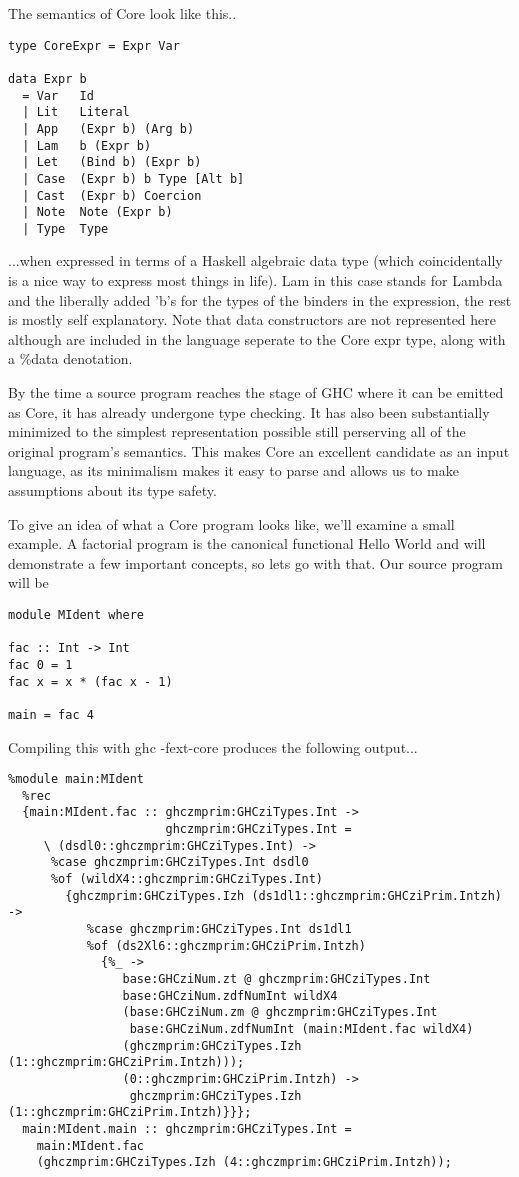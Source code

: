 \documentclass[11pt]{article}
\begin{document}
\noindent The semantics of Core look like this..

\begin{verbatim}
type CoreExpr = Expr Var

data Expr b 
  = Var	  Id
  | Lit   Literal
  | App   (Expr b) (Arg b)
  | Lam   b (Expr b)
  | Let   (Bind b) (Expr b)
  | Case  (Expr b) b Type [Alt b]
  | Cast  (Expr b) Coercion
  | Note  Note (Expr b)
  | Type  Type
\end{verbatim}

\noindent ...when expressed in terms of a Haskell algebraic data type (which 
coincidentally is a nice way to express most things in life). Lam in this
case stands for Lambda and the liberally added 'b's for the types of the binders
in the expression, the rest is mostly self explanatory. Note that data constructors
are not represented here although are included in the language seperate to the
Core expr type, along with a \%data denotation.

By the time a source program reaches the stage of GHC where it can be emitted
as Core, it has already undergone type checking. It has also been substantially 
minimized to the simplest representation
possible still perserving all of the original program's semantics. This makes
Core an excellent candidate as an input language, as its minimalism makes it
easy to parse and allows us to make assumptions about its type safety.

To give an idea of what a Core program looks like, we'll examine a small 
example. A factorial program is the canonical functional Hello World and will
demonstrate a few important concepts, so lets go with that. Our source program
will be 

\begin{verbatim}
module MIdent where

fac :: Int -> Int
fac 0 = 1
fac x = x * (fac x - 1)

main = fac 4
\end{verbatim}

\noindent Compiling this with ghc -fext-core produces the following output...

\begin{verbatim}
%module main:MIdent
  %rec
  {main:MIdent.fac :: ghczmprim:GHCziTypes.Int ->
                      ghczmprim:GHCziTypes.Int =
     \ (dsdl0::ghczmprim:GHCziTypes.Int) ->
      %case ghczmprim:GHCziTypes.Int dsdl0
      %of (wildX4::ghczmprim:GHCziTypes.Int)
        {ghczmprim:GHCziTypes.Izh (ds1dl1::ghczmprim:GHCziPrim.Intzh) ->
           %case ghczmprim:GHCziTypes.Int ds1dl1
           %of (ds2Xl6::ghczmprim:GHCziPrim.Intzh)
             {%_ ->
                base:GHCziNum.zt @ ghczmprim:GHCziTypes.Int 
                base:GHCziNum.zdfNumInt wildX4
                (base:GHCziNum.zm @ ghczmprim:GHCziTypes.Int
                 base:GHCziNum.zdfNumInt (main:MIdent.fac wildX4)
                (ghczmprim:GHCziTypes.Izh (1::ghczmprim:GHCziPrim.Intzh)));
                (0::ghczmprim:GHCziPrim.Intzh) ->
                 ghczmprim:GHCziTypes.Izh (1::ghczmprim:GHCziPrim.Intzh)}}};
  main:MIdent.main :: ghczmprim:GHCziTypes.Int =
    main:MIdent.fac
    (ghczmprim:GHCziTypes.Izh (4::ghczmprim:GHCziPrim.Intzh));
\end{verbatim}
\end{document}
